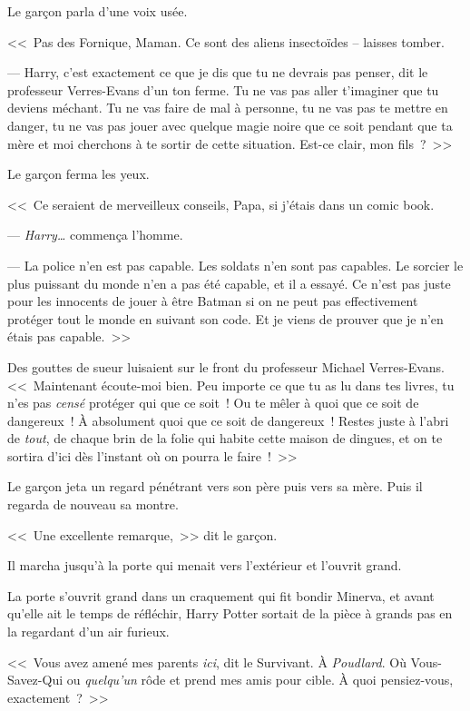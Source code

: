 Le garçon parla d'une voix usée.

<<~Pas des Fornique, Maman. Ce sont des aliens insectoïdes -- laisses tomber.

--- Harry, c'est exactement ce que je dis que tu ne devrais pas penser, dit le professeur Verres-Evans d'un ton ferme. Tu ne vas pas aller t'imaginer que tu deviens méchant. Tu ne vas faire de mal à personne, tu ne vas pas te mettre en danger, tu ne vas pas jouer avec quelque magie noire que ce soit pendant que ta mère et moi cherchons à te sortir de cette situation. Est-ce clair, mon fils~?~>>

Le garçon ferma les yeux.

<<~Ce seraient de merveilleux conseils, Papa, si j'étais dans un comic book.

--- \emph{Harry…} commença l'homme.

--- La police n'en est pas capable. Les soldats n'en sont pas capables. Le sorcier le plus puissant du monde n'en a pas été capable, et il a essayé. Ce n'est pas juste pour les innocents de jouer à être Batman si on ne peut pas effectivement protéger tout le monde en suivant son code. Et je viens de prouver que je n'en étais pas capable.~>>

Des gouttes de sueur luisaient sur le front du professeur Michael Verres-Evans. <<~Maintenant écoute-moi bien. Peu importe ce que tu as lu dans tes livres, tu n'es pas \emph{censé} protéger qui que ce soit~! Ou te mêler à quoi que ce soit de dangereux~! À absolument quoi que ce soit de dangereux~! Restes juste à l'abri de \emph{tout}, de chaque brin de la folie qui habite cette maison de dingues, et on te sortira d'ici dès l'instant où on pourra le faire~!~>>

Le garçon jeta un regard pénétrant vers son père puis vers sa mère. Puis il regarda de nouveau sa montre.

<<~Une excellente remarque,~>> dit le garçon.

Il marcha jusqu'à la porte qui menait vers l'extérieur et l'ouvrit grand.

\later

La porte s'ouvrit grand dans un craquement qui fit bondir Minerva, et avant qu'elle ait le temps de réfléchir, Harry Potter sortait de la pièce à grands pas en la regardant d'un air furieux.

<<~Vous avez amené mes parents \emph{ici}, dit le Survivant. À \emph{Poudlard}. Où Vous-Savez-Qui ou \emph{quelqu'un} rôde et prend mes amis pour cible. À quoi pensiez-vous, exactement~?~>>

